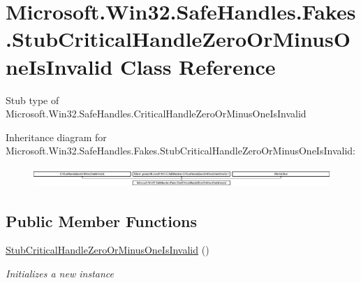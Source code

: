 \hypertarget{class_microsoft_1_1_win32_1_1_safe_handles_1_1_fakes_1_1_stub_critical_handle_zero_or_minus_one_is_invalid}{\section{Microsoft.\-Win32.\-Safe\-Handles.\-Fakes.\-Stub\-Critical\-Handle\-Zero\-Or\-Minus\-One\-Is\-Invalid Class Reference}
\label{class_microsoft_1_1_win32_1_1_safe_handles_1_1_fakes_1_1_stub_critical_handle_zero_or_minus_one_is_invalid}
}


Stub type of Microsoft.\-Win32.\-Safe\-Handles.\-Critical\-Handle\-Zero\-Or\-Minus\-One\-Is\-Invalid 


Inheritance diagram for Microsoft.\-Win32.\-Safe\-Handles.\-Fakes.\-Stub\-Critical\-Handle\-Zero\-Or\-Minus\-One\-Is\-Invalid\-:\begin{figure}[H]
\begin{center}
\leavevmode
\includegraphics[height=0.733464cm]{class_microsoft_1_1_win32_1_1_safe_handles_1_1_fakes_1_1_stub_critical_handle_zero_or_minus_one_is_invalid}
\end{center}
\end{figure}
\subsection*{Public Member Functions}
\begin{DoxyCompactItemize}
\item 
\hyperlink{class_microsoft_1_1_win32_1_1_safe_handles_1_1_fakes_1_1_stub_critical_handle_zero_or_minus_one_is_invalid_a0da27565157f0bee5ca3fc897b093137}{Stub\-Critical\-Handle\-Zero\-Or\-Minus\-One\-Is\-Invalid} ()
\begin{DoxyCompactList}\small\item\em Initializes a new instance\end{DoxyCompactList}\end{DoxyCompactItemize}
